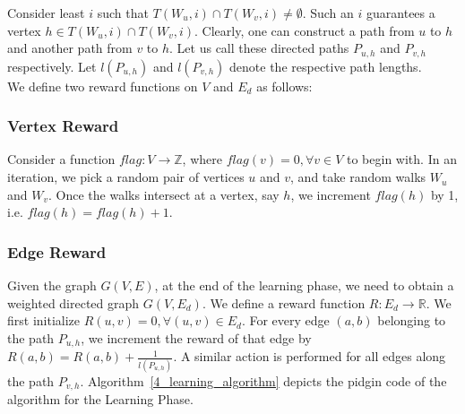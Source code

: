 \documentclass[10pt, conference, compsocconf]{IEEEtran}
\begin{document}
Consider least $i$ such that $T(W_u,i)\cap T(W_v,i)\neq \emptyset$. Such an $i$ guarantees a vertex $h\in T(W_u,i)\cap T(W_v,i)$. Clearly, one can construct a path from $u$ to $h$ and another path from $v$ to $h$. Let us call these directed paths $P_{u,h}$ and $P_{v,h}$ respectively. Let $l(P_{u,h})$ and $l(P_{v,h})$ denote the respective path lengths.\\

We define two reward functions on $V$ and $E_d$ as follows:\\

\subsubsection{Vertex Reward}

Consider a function $flag :V\rightarrow \mathbb{Z}$, where 
$flag(v)=0, \forall v\in V$ to begin with. In an iteration, we 
pick a random pair of vertices $u$ and $v$, and take random walks 
$W_u$ and $W_v$. Once the walks intersect at a vertex, say $h$, we 
increment $flag(h)$ by 1, i.e. $flag(h)=flag(h)+1$.\\

\subsubsection{Edge Reward}

Given the graph $G(V,E)$, at the end of the learning phase, we need 
to obtain a weighted directed graph $G(V,E_d)$. We define a reward function $R:E_d\rightarrow \mathbb{R}$. We first initialize $R(u,v)=0, \forall (u,v) \in E_d$. For every edge $(a,b)$ belonging to the path $P_{u,h}$, we increment the reward of that edge by $R(a,b)=R(a,b)+\frac{1}{l(P_{u,h})}$. 
A similar action is performed for all edges along the path $P_{v,h}$.
Algorithm~\ref{4_learning_algorithm} depicts the pidgin code of the algorithm for the Learning Phase.\\
\end{document}
